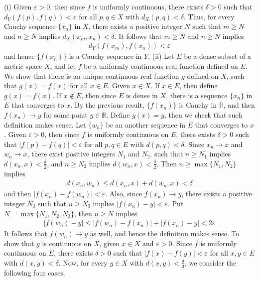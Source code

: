 \documentclass[12pt]{article}
\theoremstyle{definition}
\begin{document}
(i) Given $\varepsilon>0$, then since $f$ is uniformly continuous, there exists $\delta>0$ such that $d_Y(f(p),f(q))<\varepsilon$ for all $p,q\in X$ with $d_X(p,q)<\delta$. Thus, for every Cauchy sequence $\{x_n\}$ in $X$, there exists a positive integer $N$ such that $m\ge N$ and $n\ge N$ implies $d_X(x_m,x_n)<\delta$. It follows that $m\ge N$ and $n\ge N$ implies
\begin{align*}
d_Y(f(x_m),f(x_n))<\varepsilon
\end{align*}
and hence $\{f(x_n)\}$ is a Cauchy sequence in $Y$.
(ii) Let $E$ be a dense subset of a metric space $X$, and let $f$ be a uniformly continuous real function defined on $E$. We show that there is an unique continuous real function $g$ defined on $X$, such that $g(x)=f(x)$ for all $x\in E$. Given $x\in X$. If $x\in E$, then define $g(x)=f(x)$. If $x\notin E$, then since $E$ is dense in $X$, there is a sequence $\{x_n\}$ in $E$ that converges to $x$. By the previous result, $\{f(x_n)\}$ is Cauchy in $\mathbb{R}$, and then $f(x_n)\to y$ for some point $y\in \mathbb{R}$. Define $g(x)=y$, then we check that such definition makes sense. Let $\{w_n\}$ be an another sequence in $E$ that converges to $x$. Given $\varepsilon>0$, then since $f$ is uniformly continuous on $E$, there exists $\delta>0$ such that $\left\vert f(p)-f(q)\right\vert<\varepsilon$ for all $p,q\in E$ with $d(p,q)<\delta$. Since $x_n\to x$ and $w_n\to x$, there exist positive integers $N_1$ and $N_2$, such that $n\ge N_1$ implies $d(x_n,x)<\frac{\delta}{2}$, and $n\ge N_2$ implies $d(w_n,x)<\frac{\delta}{2}$. Then $n\ge \max\{N_1,N_2\}$ implies
\begin{align*}
d(x_n,w_n)
\le d(x_n,x)+d(w_n,x)
<\delta
\end{align*}
and then $\left\vert f(x_n)-f(w_n)\right\vert<\varepsilon$. Also, since $f(x_n)\to y$, there exists a positive integer $N_3$ such that $n\ge N_3$ implies $\left\vert f(x_n)-y\right\vert<\varepsilon$. Put $N=\max\{N_1,N_2,N_3\}$, then $n\ge N$ implies
\begin{align*}
\left\vert f(w_n)-y\right\vert
\le \left\vert f(w_n)-f(x_n)\right\vert+\left\vert f(x_n)-y\right\vert
<2\varepsilon
\end{align*}
It follows that $f(w_n)\to y$ as well, and hence the definition makes sense. To show that $g$ is continuous on $X$, given $x\in X$ and $\varepsilon>0$. Since $f$ is uniformly continuous on $E$, there exists $\delta>0$ such that $\left\vert f(x)-f(y)\right\vert<\varepsilon$ for all $x,y\in E$ with $d(x,y)<\delta$. Now, for every $y\in X$ with $d(x,y)<\frac{\delta}{3}$, we consider the following four cases.
\end{document}
